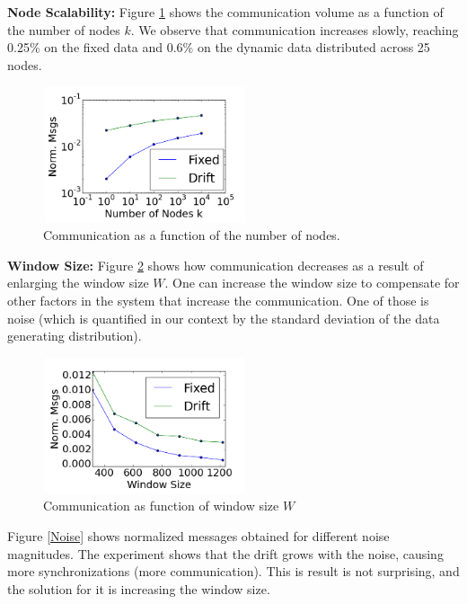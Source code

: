 \documentclass{sig-alternate-05-2015}
\begin{document}
	
\noindent\textbf{Node Scalability:}
Figure \ref{Nodes} shows the communication volume as a function of the number of nodes $k$.
We observe that communication increases slowly, reaching 0.25\% on the fixed
data and 0.6\% on the dynamic data distributed across 25 nodes.
	\begin{figure}[h]
	\centering
	\includegraphics[width=60mm, height=4cm]{CommunicationOfFixedVsDrift/Nodes.png}
	\caption{Communication as a function of the number of nodes.}
	\label{Nodes}
	\end{figure}

\noindent\textbf{Window Size:}
Figure \ref{WindowSize} shows how communication decreases as a result
of enlarging the window size $W$.  One can increase the window size to compensate for other factors in the system that increase the communication. One of those is
noise (which is quantified in our context by the standard deviation of the
data generating distribution).
 \begin{figure}
	\centering
	\includegraphics[width=60mm, height=4cm]{CommunicationOfFixedVsDrift/WindowSize.png}
	\caption{Communication as function of window size $W$}
	\label{WindowSize}
	\end{figure}
Figure \ref{Noise} shows normalized messages obtained for different
noise magnitudes. The experiment shows that the drift grows with the noise, causing more synchronizations (more communication). This is result is not surprising, and the solution for it is increasing the window size. 
\end{document}

